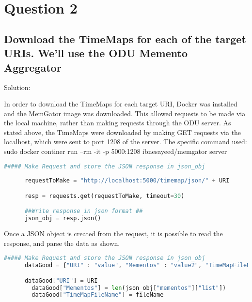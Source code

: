 \documentclass[11pt]{scrartcl} %
\begin{document}
\pagebreak

\section*{Question 2}\bigskip


\subsection*{Download the TimeMaps for each of the target URIs.  We'll use the ODU 
Memento Aggregator}

\bigskip\bigskip
\Large Solution: \newline\newline\small

\tabto{2.0cm} In order to download the TimeMaps for each target URI, Docker was installed and the MemGator image was downloaded. This allowed requests to be made via the local machine, rather than making requests through the ODU server. As stated above, the TimeMaps were downloaded by making GET requests via the localhost, which were sent to port 1208 of the server. The specific command used: sudo docker continer run --rm -it -p 5000:1208 ibnesayeed/memgator server

\begin{lstlisting}[language = Python, caption=Make TimeMap Request]
##### Make Request and store the JSON response in json_obj
      
      requestToMake = "http://localhost:5000/timemap/json/" + URI

      resp = requests.get(requestToMake, timeout=30)

      ##Write response in json format ##
      json_obj = resp.json()
\end{lstlisting} 

\tabto{2.0cm}Once a JSON object is created from the request, it is possible to read the response, and parse the data as shown.

\begin{lstlisting}[language = Python, caption=JSON Request]
##### Make Request and store the JSON response in json_obj
      dataGood = {"URI" : "value", "Mementos" : "value2", "TimeMapFileName" : "value3" }

      dataGood["URI"] = URI
        dataGood["Mementos"] = len(json_obj["mementos"]["list"])
        dataGood["TimeMapFileName"] = fileName
\end{lstlisting} 
\end{document}
